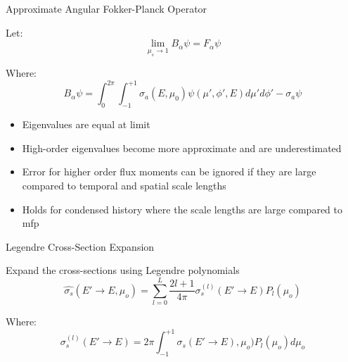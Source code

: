 \documentclass{beamer}
\begin{document}
\begin{frame}{Approximate Angular Fokker-Planck Operator}
 
     Let:  $$\lim_{ \mu_s \to 1}B_{\alpha}\psi = F_{\alpha}\psi $$

     Where:  $$B_{\alpha}\psi=\int_{0}^{2\pi}\int_{-1}^{+1} \sigma_a(E,\mu_0)\psi(\mu',\phi',E)d\mu'd\phi' - \sigma_a\psi$$

    \begin{itemize}
      \item Eigenvalues are equal at limit

      \item High-order eigenvalues become more approximate and are underestimated

      \item Error for higher order flux moments can be ignored if they are large compared to temporal and spatial scale lengths
 
      \item  Holds for condensed history where the scale lengths are large compared to mfp
    \end{itemize}

\end{frame}


\begin{frame}{Legendre Cross-Section Expansion}
 
Expand the cross-sections using Legendre polynomials
$$ \hat{\sigma_s}(E'\to E,\mu_o)=\sum_{l=0}^{L} \frac{2l+1}{4\pi}\sigma_s^{(l)}(E'\to E)P_l(\mu_o)$$

Where:
$$ \sigma_s^{(l)}(E'\to E) = 2\pi\int_{-1}^{+1} \sigma_s(E'\to E),\mu_o)P_l(\mu_o)d\mu_o$$

\end{frame}
\end{document}
